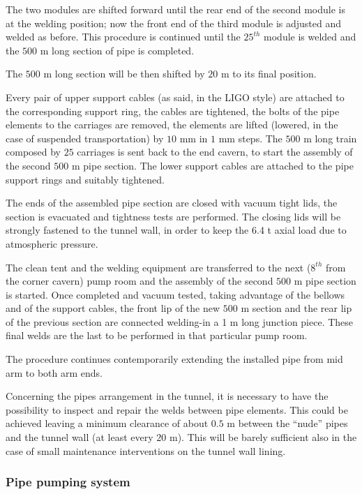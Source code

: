 The two modules are shifted forward until the rear end of the second module is at the welding position; now the front end of the third module is adjusted and welded as before. This procedure is continued until the $25^{th}$ module is welded and the $500$ m long section of pipe is completed.

The $500$ m long section will be then shifted by $20$ m to its final position.

Every pair of upper support cables (as said, in the LIGO style) are attached to the corresponding support ring, the cables are tightened, the bolts of the pipe elements to the carriages are removed, the elements are lifted (lowered, in the case of suspended transportation) by $10$ mm in $1$ mm steps. The $500$ m long train composed by $25$ carriages is sent back to the end cavern, to start the assembly of the second $500$ m pipe section. The lower support cables are attached to the pipe support rings and suitably tightened.

The ends of the assembled pipe section are closed with vacuum tight lids, the section is evacuated and tightness tests are performed. The closing lids will be strongly fastened to the tunnel wall, in order to keep the 6.4 t axial load due to atmospheric pressure.

The clean tent and the welding equipment are transferred to the next ($8^{th}$ from the corner cavern) pump room and the assembly of the second $500$ m pipe section is started. Once completed and vacuum tested, taking advantage of the bellows and of the support cables, the front lip of the new $500$ m section and the rear lip of the previous section are connected welding-in a 1 m long junction piece. These final welds are the last to be performed in that particular pump room.

The procedure continues contemporarily extending the installed pipe from mid arm to both arm ends.

Concerning the pipes arrangement in the tunnel, it is necessary to have the possibility to inspect and repair the welds between pipe elements. This could be achieved leaving a minimum clearance of about $0.5$ m between the ``nude'' pipes and the tunnel wall (at least every $20$ m). This will be barely sufficient also in the case of small maintenance interventions on the tunnel wall lining.



\subsubsection{Pipe pumping system}

